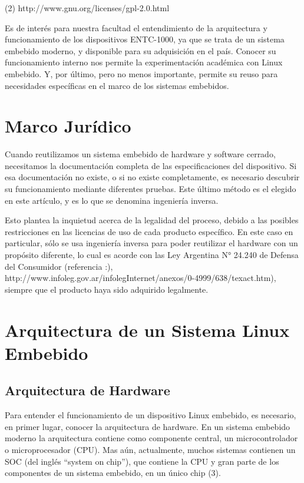 \documentclass[conference]{IEEEtran}
\begin{document}
(2)
http://www.gnu.org/licenses/gpl-2.0.html


Es de interés para nuestra facultad el entendimiento de la arquitectura y funcionamiento
de los dispositivos ENTC-1000,
ya que se trata de un sistema embebido moderno, y disponible
para su adquisición en el país. Conocer su funcionamiento interno
nos permite la experimentación académica con Linux embebido. Y,
por último, pero no menos importante, permite su reuso para necesidades
específicas en el marco de los sistemas embebidos.


\section{Marco Jurídico}


Cuando reutilizamos un sistema embebido de hardware y software cerrado, necesitamos la
documentación completa de las especificaciones del dispositivo.
Si esa documentación no existe, o si no existe
completamente, es necesario descubrir su funcionamiento mediante
diferentes pruebas. Este último método es el elegido en este artículo, y es lo que 
se denomina ingeniería inversa.

Esto plantea la inquietud acerca de la legalidad 
del proceso, debido a las posibles restricciones en las licencias de uso de cada producto
específico. En este caso en particular, sólo se usa ingeniería inversa para poder
reutilizar el hardware con un propósito diferente, lo cual es acorde con las Ley
Argentina N° 24.240 de Defensa del Consumidor (referencia :),
http://www.infoleg.gov.ar/infolegInternet/anexos/0-4999/638/texact.htm),
siempre que el producto haya sido adquirido legalmente.  

\section{Arquitectura de un Sistema Linux Embebido}

\subsection{Arquitectura de Hardware}

Para entender el funcionamiento de un dispositivo Linux embebido, es necesario, en primer lugar, conocer
la arquitectura de hardware. En un sistema embebido moderno la arquitectura
contiene como componente central, un microcontrolador o microprocesador (CPU).
Mas aún, actualmente, muchos sistemas contienen un SOC (del inglés ``system on chip''),
que contiene la CPU y gran parte de los componentes de un sistema embebido, en un
único chip (3).
\end{document}
